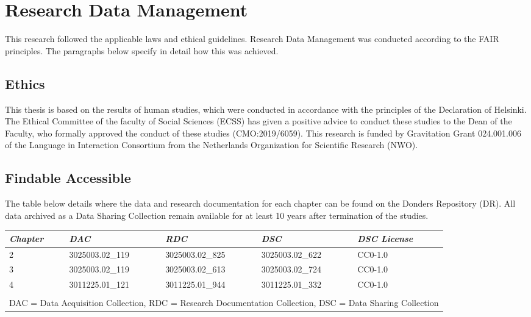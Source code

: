 \chapter*{Research Data Management}
\label{ch:researchdatamanagement}

This research followed the applicable laws and ethical guidelines. Research Data Management was conducted according to the FAIR principles. The paragraphs below specify in detail how this was achieved.

\section*{Ethics}
This thesis is based on the results of human studies, which were conducted in accordance with the principles of the Declaration of Helsinki. The Ethical Committee of the faculty of Social Sciences (ECSS) has given a positive advice to conduct these studies to the Dean of the Faculty, who formally approved the conduct of these studies (CMO:2019/6059). This research is funded by Gravitation Grant 024.001.006 of the Language in Interaction Consortium from the Netherlands Organization for Scientific Research (NWO).

\section*{Findable Accessible}
The table below details where the data and research documentation for each chapter can be found on the Donders Repository (DR). All data archived as a Data Sharing Collection remain available for at least 10 years after termination of the studies.

\begin{table}[ht]
    \captionsetup{justification=raggedright, singlelinecheck=false, font = normal} %
    \setlength{\tabcolsep}{7pt}
    \renewcommand{\arraystretch}{1.2} %
    \begin{tabular}{lllll}
    \hline
    \textit{Chapter} & \textit{DAC} & \textit{RDC} & \textit{DSC} & \textit{DSC License} \\
    \hline
    2 & 3025003.02\_119 & 3025003.02\_825 & 3025003.02\_622 & CC0-1.0 \\
    3 & 3025003.02\_119 & 3025003.02\_613 & 3025003.02\_724 & CC0-1.0 \\
    4 & 3011225.01\_121 & 3011225.01\_944 & 3011225.01\_332 & CC0-1.0 \\
    \hline\\[-.4cm]
    \multicolumn{5}{l}{\parbox{11cm}{\fontsize{8pt}{0pt}\selectfont DAC = Data Acquisition Collection, RDC = Research Documentation Collection, DSC = Data Sharing Collection}} \\
    \end{tabular}
\end{table}

